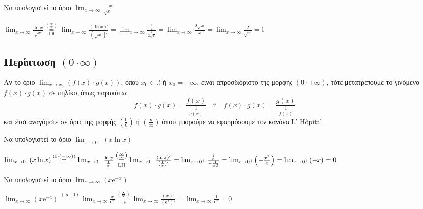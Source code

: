 \begin{example}
  Να υπολογιστεί το όριο $ \lim_{x \to \infty} \frac{\ln{x}}{\sqrt{x}} $
\end{example}
\begin{solution}
  $ \lim_{x \to \infty} \frac{\ln{x}}{\sqrt{x}}
  \overset{\left(\frac{\infty}{\infty}\right)}{\underset{\mathrm{LH}}{=}} 
  \lim_{x \to \infty} \frac{(\ln{x} )'}{(\sqrt{x} )'} = \lim_{x \to \infty}
  \frac{\frac{1}{x}}{\frac{1}{2 \sqrt{x}}} = \lim_{x \to \infty} 
  \frac{2 \sqrt{x} }{x} = \lim_{x \to \infty} \frac{2}{\sqrt{x}} = 0
  $
\end{solution}


\subsection*{Περίπτωση $ (0 \cdot \infty) $}

Αν το όριο $ \lim_{x \to x_{0}} \left(f(x)\cdot g(x)\right) $, όπου $ x_{0} \in
\mathbb{R} $ ή $ x_{0}= \pm \infty $, είναι απροσδιόριστο της μορφής $ (0 \cdot \pm
\infty) $, τότε μετατρέπουμε το γινόμενο $ f(x) \cdot g(x) $ σε πηλίκο, όπως παρακάτω:
\[
  f(x)\cdot g(x) = \frac{f(x)}{\frac{1}{g(x)}} \quad \text{ή} \quad
  f(x) \cdot g(x) = \frac{g(x)}{\frac{1}{f(x)}}  
\] 
και έτσι αναγόμστε σε όριο της μορφής $ (\frac{0}{0}) $ ή $
(\frac{\infty}{\infty}) $ όπου μπορούμε να εφαρμόσουμε τον κανόνα L' H\^{o}pital.

\begin{example}
  Να υπολογιστεί το όριο $ \lim_{x \to 0^{+}} (x \ln{x}) $
\end{example}
\begin{solution}
  $ \lim_{x \to 0^{+}} (x \ln{x}) \overset{(0 \cdot (-\infty))}{=} \lim_{x \to 0^{+}}
  \frac{\ln{x}}{\frac{1}{x}}
  \overset{\left(\frac{\infty}{\infty}\right)}{\underset{\mathrm{LH}}{=}} 
  \lim_{x \to 0^{+}} \frac{(\ln{x} )'}{(\frac{1}{x} )'} = \lim_{x \to 0^{+}}
  \frac{\frac{1}{x}}{- \frac{1}{x{2}}} = \lim_{x \to 0^{+}} \Bigl(-\frac{x^{2}}{x}\Bigr) 
  = \lim_{x \to 0^{+}} (-x) = 0 $
\end{solution}

\begin{example}
  Να υπολογιστεί το όριο $ \lim_{x \to \infty} (x \mathrm{e}^{-x}) $
\end{example}
\begin{solution}
  $ \lim_{x \to \infty} (x \mathrm{e}^{-x} ) \overset{(\infty\cdot 0)}{=} \lim_{x \to
  \infty} \frac{x}{\mathrm{e}^{x}}
  \overset{\left(\frac{\infty}{\infty}\right)}{\underset{\mathrm{LH}}{=}} 
  \lim_{x \to \infty} \frac{(x)'}{(\mathrm{e}^{x} )'} = \lim_{x \to \infty}
  \frac{1}{\mathrm{e}^{x}} = 0 $
\end{solution}


